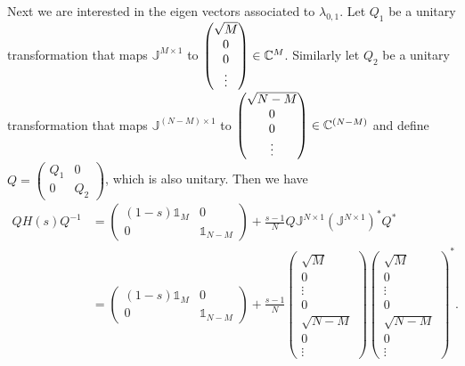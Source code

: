 Next we are interested in the eigen vectors associated to $\lambda_{0,1}$. Let $Q_1$ be a unitary transformation that maps $\mathbb{J}^{M\times 1}$ to $\begin{pmatrix}
\sqrt{M} \\ 0 \\ 0 \\ \vdots
\end{pmatrix} \in \mathbb{C}^M$. Similarly let $Q_2$ be a unitary transformation that maps $\mathbb{J}^{(N-M)\times 1}$ to $\begin{pmatrix}
\sqrt{N-M} \\ 0 \\ 0 \\ \vdots
\end{pmatrix} \in \mathbb{C}^{(N-M)}$ and define $Q = \begin{pmatrix}
Q_1 & 0 \\ 0 & Q_2
\end{pmatrix}$, which is also unitary. Then we have
\begin{align*}
    QH(s)Q^{-1} &= \begin{pmatrix}
        (1-s)\mathbb{1}_M & 0 \\ 0 & \mathbb{1}_{N-M}
        \end{pmatrix} + \frac{s-1}{N}Q\mathbb{J}^{N\times 1}(\mathbb{J}^{N\times 1})^*Q^* \\
    &= \begin{pmatrix}
        (1-s)\mathbb{1}_M & 0 \\ 0 & \mathbb{1}_{N-M}
        \end{pmatrix} + \frac{s-1}{N} \begin{pmatrix}\sqrt{M} \\ 0 \\ \vdots \\ 0 \\ \sqrt{N-M} \\ 0 \\ \vdots \end{pmatrix}\begin{pmatrix}\sqrt{M} \\ 0 \\ \vdots \\ 0 \\ \sqrt{N-M} \\ 0 \\ \vdots \end{pmatrix}^*.
\end{align*}

